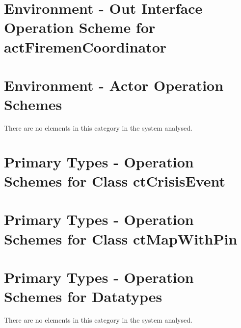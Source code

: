 \section{Environment - Out Interface Operation Scheme for actFiremenCoordinator}
\label{OM-EM-OutInterface-OS-actFiremenCoordinator}




\section{Environment - Actor Operation Schemes}
There are no elements in this category in the system analysed.
		



\section{Primary Types - Operation Schemes for Class ctCrisisEvent} 
\label{OM-CM-PTClass-ctCrisisEvent}

\section{Primary Types - Operation Schemes for Class ctMapWithPin} 
\label{OM-CM-PTClass-ctMapWithPin}







\section{Primary Types - Operation Schemes for Datatypes}
There are no elements in this category in the system analysed.




